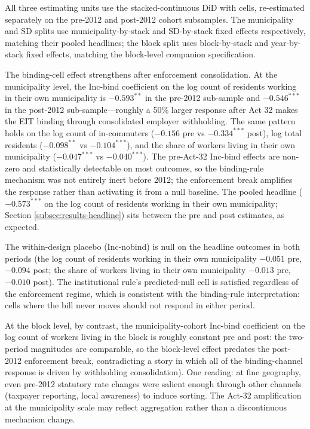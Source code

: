\documentclass[12pt]{article}
\begin{document}


All three estimating units use the stacked-continuous DiD with
cells, re-estimated separately on the pre-2012 and
post-2012 cohort subsamples. The municipality and SD splits use
municipality-by-stack and SD-by-stack fixed effects respectively, matching
their pooled headlines; the block split uses block-by-stack and
year-by-stack fixed effects, matching the block-level companion specification.


The binding-cell effect strengthens after enforcement consolidation.
At the municipality level, the Inc-bind coefficient on
the log count of residents working in their own municipality is $-0.593^{**}$ in the pre-2012
sub-sample and $-0.546^{***}$ in the post-2012 sub-sample---roughly
a 50\% larger response after Act 32 makes the EIT binding through
consolidated employer withholding. The same pattern holds on
the log count of in-commuters ($-0.156$ pre vs $-0.334^{***}$ post),
log total residents ($-0.098^{**}$ vs $-0.104^{***}$),
and the share of workers living in their own municipality ($-0.047^{***}$ vs $-0.040^{***}$). The
pre-Act-32 Inc-bind effects are non-zero and statistically detectable
on most outcomes, so the binding-rule mechanism was not entirely
inert before 2012; the enforcement break amplifies the response
rather than activating it from a null baseline. The pooled headline
($-0.573^{***}$ on the log count of residents working in their own municipality; Section
\ref{subsec:results-headline}) sits between the pre and post
estimates, as expected.

The within-design placebo (Inc-nobind) is null on the headline outcomes in both periods (the log count of residents working in their own municipality
$-0.051$ pre, $-0.094$ post; the share of workers living in their own municipality $-0.013$ pre,
$-0.010$ post). The institutional rule's predicted-null cell is
satisfied regardless of the enforcement regime, which is consistent
with the binding-rule interpretation: cells where the bill never
moves should not respond in either period.

At the block level, by contrast, the municipality-cohort Inc-bind coefficient on
the log count of workers living in the block is roughly constant pre and post: the two-period magnitudes are comparable, so the
block-level effect predates the post-2012 enforcement break,
contradicting a story in which all of the binding-channel response
is driven by withholding consolidation). One reading: at fine
geography, even pre-2012 statutory rate changes were salient
enough through other channels (taxpayer reporting, local awareness)
to induce sorting. The Act-32 amplification at the municipality
scale may reflect aggregation rather than a discontinuous mechanism
change.
\end{document}
